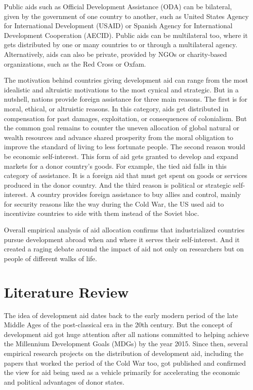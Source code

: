 \documentclass{swfuthesise}
\begin{document}
Public aids such as Official Development Assistance (ODA) can be bilateral, given by the government of one country to another, such as United States Agency for International Development (USAID) or Spanish Agency for International Development Cooperation (AECID). Public aids can be multilateral too, where it gets distributed by one or many countries to or through a multilateral agency. Alternatively, aids can also be private, provided by NGOs or charity-based organizations, such as the Red Cross or Oxfam.

The motivation behind countries giving development aid can range from the most idealistic and altruistic motivations to the most cynical and strategic. But in a nutshell, nations provide foreign assistance for three main reasons. The first is for moral, ethical, or altruistic reasons. In this category, aids get distributed in compensation for past damages, exploitation, or consequences of colonialism. But the common goal remains to counter the uneven allocation of global natural or wealth resources and advance shared prosperity from the moral obligation to improve the standard of living to less fortunate people. The second reason would be economic self-interest. This form of aid gets granted to develop and expand markets for a donor country’s goods. For example, the tied aid falls in this category of assistance. It is a foreign aid that must get spent on goods or services produced in the donor country. And the third reason is political or strategic self-interest. A country provides foreign assistance to buy allies and control, mainly for security reasons like the way during the Cold War, the US used aid to incentivize countries to side with them instead of the Soviet bloc. 

Overall empirical analysis of aid allocation confirms that industrialized countries pursue development abroad when and where it serves their self-interest. And it created a raging debate around the impact of aid not only on researchers but on people of different walks of life.

\section{Literature Review}
\label{sec:lit}

The idea of development aid dates back to the early modern period of the late Middle Ages of the post-classical era in the 20th century. But the concept of development aid got huge attention after all nations committed to helping achieve the Millennium Development Goals (MDGs) by the year 2015. Since then, several empirical research projects on the distribution of development aid, including the papers that worked the period of the Cold War too, got published and confirmed the view for aid being used as a vehicle primarily for accelerating the economic and political advantages of donor states. 
\end{document}
